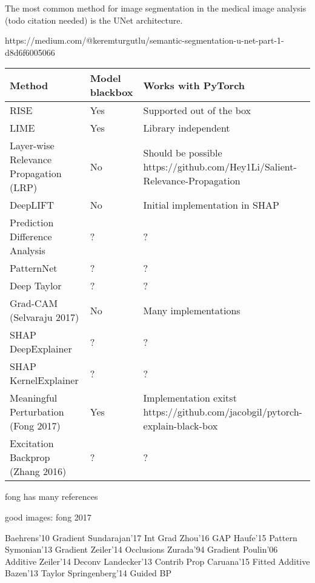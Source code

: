 The most common method for image segmentation in the medical image analysis (todo citation needed) is the UNet\cite{todo} architecture.



https://medium.com/@keremturgutlu/semantic-segmentation-u-net-part-1-d8d6f6005066


\begin{tabular}{| p{7cm} | p{2.5cm} | p{6cm} | }
\hline
\textbf{Method} & \textbf{Model blackbox} & \textbf{Works with PyTorch} \\ \hline
RISE\cite{Petsiuk2018rise} & Yes & Supported out of the box \\ \hline
LIME\cite{ribeiro2016should} & Yes & Library independent \\ \hline
Layer-wise Relevance Propagation (LRP) & No & Should be possible  https://github.com/Hey1Li/Salient-Relevance-Propagation \\ \hline
DeepLIFT & No & Initial implementation in SHAP\cite{NIPS2017_7062} \\ \hline
Prediction Difference Analysis \cite{todo} & ? & ? \\ \hline
PatternNet & ? & ? \\ \hline
Deep Taylor & ? & ? \\ \hline
Grad-CAM (Selvaraju 2017) & No & Many implementations \\ \hline
SHAP DeepExplainer\cite{NIPS2017_7062} & ? & ? \\ \hline
SHAP KernelExplainer\cite{NIPS2017_7062} & ? & ? \\ \hline
Meaningful Perturbation (Fong 2017)\cite{todo} & Yes & Implementation exitst \cite{todo} https://github.com/jacobgil/pytorch-explain-black-box \\ \hline
Excitation Backprop (Zhang 2016)\cite{todo}  & ? & ? \\ \hline
\end{tabular}


fong has many references

good images: fong 2017

Baehrens'10 Gradient
Sundarajan'17 Int Grad
Zhou'16 GAP
Haufe'15 Pattern
Symonian'13 Gradient
Zeiler'14 Occlusions
Zurada'94 Gradient
Poulin'06 Additive
Zeiler'14 Deconv
Landecker'13 Contrib Prop
Caruana'15 Fitted Additive
Bazen'13 Taylor
Springenberg'14 Guided BP


